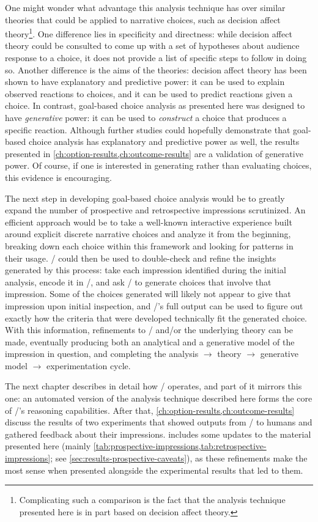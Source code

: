 One might wonder what advantage this analysis technique has over similar theories that could be applied to narrative choices, such as decision affect theory\footnote{Complicating such a comparison is the fact that the analysis technique presented here is in part based on decision affect theory.}\citep{Mellers1997}.
%
One difference lies in specificity and directness: while decision affect theory could be consulted to come up with a set of hypotheses about audience response to a choice, it does not provide a list of specific steps to follow in doing so.
%
Another difference is the aims of the theories: decision affect theory has been shown to have explanatory and predictive power: it can be used to explain observed reactions to choices, and it can be used to predict reactions given a choice.
%
In contrast, goal-based choice analysis as presented here was designed to have \emph{generative} power: it can be used to \emph{construct} a choice that produces a specific reaction.
%
Although further studies could hopefully demonstrate that goal-based choice analysis has explanatory and predictive power as well, the results presented in \cref{ch:option-results,ch:outcome-results} are a validation of generative power.
%
Of course, if one is interested in generating rather than evaluating choices, this evidence is encouraging.


The next step in developing goal-based choice analysis would be to greatly expand the number of prospective and retrospective impressions scrutinized.
%
An efficient approach would be to take a well-known interactive experience built around explicit discrete narrative choices and analyze it from the beginning, breaking down each choice within this framework and looking for patterns in their usage.
%
\dunyazad/ could then be used to double-check and refine the insights generated by this process: take each impression identified during the initial analysis, encode it in \dunyazad/, and ask \dunyazad/ to generate choices that involve that impression.
%
Some of the choices generated will likely not appear to give that impression upon initial inspection, and \dunyazad/'s full output can be used to figure out exactly how the criteria that were developed technically fit the generated choice.
%
With this information, refinements to \dunyazad/ and/or the underlying theory can be made, eventually producing both an analytical and a generative model of the impression in question, and completing the analysis $\rightarrow$ theory $\rightarrow$ generative model $\rightarrow$ experimentation cycle.


The next chapter describes in detail how \dunyazad/ operates, and part of it mirrors this one: an automated version of the analysis technique described here forms the core of \dunyazad/'s reasoning capabilities.
%
After that, \cref{ch:option-results,ch:outcome-results} discuss the results of two experiments that showed outputs from \dunyazad/ to humans and gathered feedback about their impressions.
%
 includes some updates to the material presented here (mainly \cref{tab:prospective-impressions,tab:retrospective-impressions}; see \cref{sec:results-prospective-caveats}), as these refinements make the most sense when presented alongside the experimental results that led to them.
